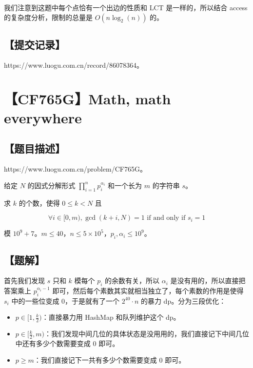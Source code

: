 \documentclass[UTF8,12pt,a4paper]{ctexart}
\begin{document}
	我们注意到这题中每个点恰有一个出边的性质和 LCT 是一样的，所以结合 access 的复杂度分析，限制的总量是 $O(n\log_2(n))$ 的。
	
	\subsection*{【提交记录】}
	
	https://www.luogu.com.cn/record/86078364。
	
	
	\section*{【CF765G】Math, math everywhere}
	
	\subsection*{【题目描述】}
	
	https://www.luogu.com.cn/problem/CF765G。
	
	给定 $N$ 的因式分解形式 $\prod_{i=1}^np_i^{\alpha_i}$ 和一个长为 $m$ 的字符串 $s$。
	
	求 $k$ 的个数，使得 $0\leq k<N$ 且
	
	$$\forall i\in[0,m),\gcd(k+i,N)=1 \text{  if and only if  }s_i=1$$
	
	模 $10^9+7$。$m \leq 40$，$n\leq 5\times 10^5$，$p_i, \alpha_i \leq 10^9$。
	
	\subsection*{【题解】}
	
	首先我们发现 $s$ 只和 $k$ 模每个 $p_i$ 的余数有关，所以 $\alpha_i$ 是没有用的，所以直接把答案乘上 $p_i^{\alpha_i-1}$ 即可，然后每个素数其实就相当独立了，每个素数的作用是使得 $s_i$ 中的一些位变成 $0$，于是就有了一个 $2^{40}\cdot n$ 的暴力 dp。分为三段优化：
	
	\begin{itemize}
		\item $p\in [1,\frac k2)$：直接暴力用 HashMap 和队列维护这个 dp。
		\item $p\in [\frac k2, m)$：我们发现中间几位的具体状态是没用用的，我们直接记下中间几位中还有多少个数需要变成 $0$ 即可。
		\item $p\ge m$：我们直接记下一共有多少个数需要变成 $0$ 即可。
	\end{itemize}
\end{document}

